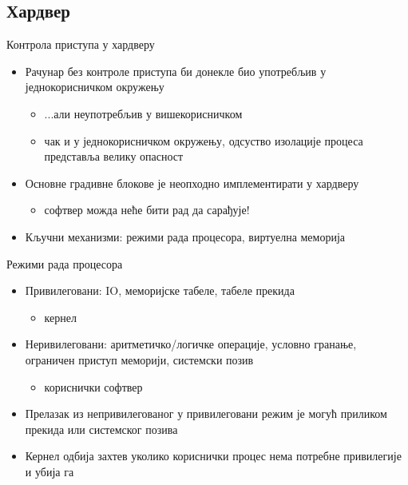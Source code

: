 \documentclass[xcolor=table]{beamer}
\begin{document}
    \subsection{Хардвер}
    
    \begin{frame}{Контрола приступа у хардверу}
        \begin{itemize}
            \item Рачунар без контроле приступа би донекле био употребљив у једнокорисничком окружењу
            \begin{itemize}
                \item ...али неупотребљив у вишекорисничком
                \item чак и у једнокорисничком окружењу, одсуство изолације процеса представља велику опасност
            \end{itemize}
            \item Основне градивне блокове је неопходно имплементирати у хардверу
            \begin{itemize}
                \item софтвер можда неће бити рад да сарађује!
            \end{itemize}
            \item Кључни механизми: режими рада процесора, виртуелна меморија
        \end{itemize}
    \end{frame}
    
    \begin{frame}{Режими рада процесора}
        \begin{itemize}
            \item Привилеговани: IO, меморијске табеле, табеле прекида
            \begin{itemize}
                \item кернел
            \end{itemize}
            \item Неривилеговани: аритметичко/логичке операције, условно гранање, ограничен приступ меморији, системски позив
            \begin{itemize}
                \item кориснички софтвер
            \end{itemize}
            \item Прелазак из непривилегованог у привилеговани режим је могућ приликом прекида или системског позива
            \item Кернел одбија захтев уколико кориснички процес нема потребне привилегије и убија га
        \end{itemize}
    \end{frame}
    
\end{document}
